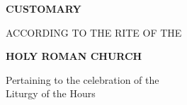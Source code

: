 


	\begin{titlepage}
		\vspace*{\fill}
		
		\begin{center}
			
			\textbf{\Huge\color{red} CUSTOMARY}
			
			ACCORDING TO THE RITE OF THE
			
			\textbf{\LARGE HOLY ROMAN CHURCH}
			
			\vspace*{\fill}
			
			Pertaining to the celebration of the\\Liturgy of the Hours
			
		\end{center}
		
		\vspace*{\fill}
	\end{titlepage}
	
	
	
	\raggedbottom
	
	
	
	
